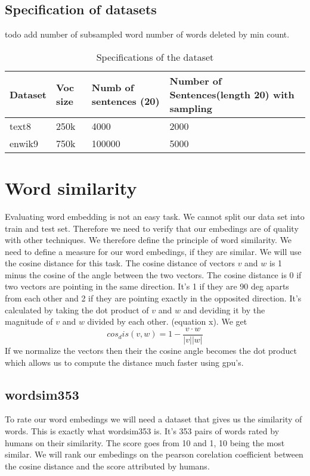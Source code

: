 \subsection{Specification of datasets}
todo add number of subsampled word number of words deleted by min count.
\begin{table}[]
\begin{tabular}{|l|l|l|l|}
\hline
Dataset & Voc size & Numb of sentences (20) & Number of Sentences(length 20) with sampling \\ \hline
text8   & 250k     & 4000                   & 2000                                         \\ \hline
enwik9  & 750k     & 100000                 & 5000                                         \\ \hline
\end{tabular}
\caption{Specifications of the dataset}
\end{table}

\section{Word similarity}
Evaluating word embedding is not an easy task. We cannot split our data set into train and test set. Therefore we need to verify that our embedings are of quality with other techniques. We therefore define the principle of word similarity. We need to define a measure for our word embedings, if they are similar. We will use the cosine distance for this task. The cosine distance of vectors $v$ and $w$ is 1 minus the cosine of the angle between the two vectors. The cosine distance is 0 if two vectors are pointing in the same direction. It's 1 if they are 90 deg aparts from each other and 2 if they are pointing exactly in the opposited direction. It's calculated by taking the dot product of $v$ and $w$ and deviding it by the magnitude of $v$ and $w$ divided by each other. (equation x). We get
\begin{equation}
cos_dis(v,w) =1 - \frac{v \cdot w}{|v| |w|} 
\end{equation}
If we normalize the vectors then their the cosine angle becomes the dot product which allows us to compute the distance much faster using gpu's. 
\subsection{wordsim353}
To rate our word embedings we will need a dataset that gives us the similarity of words. This is exactly what wordsim353 is. It's 353 pairs of words rated by humans on their similarity. The score goes from 10 and 1, 10 being the most similar. We will rank our embedings on the pearson corelation coefficient between the cosine distance and the score attributed by humans. 

